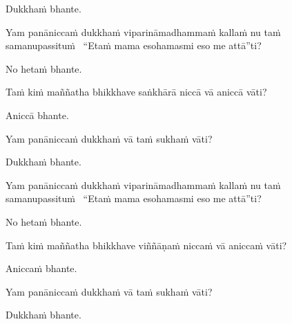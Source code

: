 \begin{pali-hangtogether}
  Dukkhaṁ bhante.
\end{pali-hangtogether}

\begin{pali-hangtogether}
  Yam panāniccaṁ dukkhaṁ viparināmadhammaṁ kallaṁ nu taṁ samanupassituṁ \breathmark\ ``Etaṁ mama esohamasmi eso me attā''ti?
\end{pali-hangtogether}

\begin{pali-hangtogether}
  No hetaṁ bhante.
\end{pali-hangtogether}

\begin{pali-hang}
  Taṁ kiṁ maññatha bhikkhave saṅkhārā niccā vā aniccā vāti?
\end{pali-hang}

\begin{pali-hangtogether}
  Aniccā bhante.
\end{pali-hangtogether}

\begin{pali-hangtogether}
  Yam panāniccaṁ dukkhaṁ vā taṁ sukhaṁ vāti?
\end{pali-hangtogether}

\begin{pali-hangtogether}
  Dukkhaṁ bhante.
\end{pali-hangtogether}

\begin{pali-hangtogether}
  Yam panāniccaṁ dukkhaṁ viparināmadhammaṁ kallaṁ nu taṁ samanupassituṁ \breathmark\ ``Etaṁ mama esohamasmi eso me attā''ti?
\end{pali-hangtogether}

\begin{pali-hangtogether}
  No hetaṁ bhante.
\end{pali-hangtogether}

\begin{pali-hang}
  Taṁ kiṁ maññatha bhikkhave viññāṇaṁ niccaṁ vā aniccaṁ vāti?
\end{pali-hang}

\begin{pali-hangtogether}
  Aniccaṁ bhante.
\end{pali-hangtogether}

\begin{pali-hangtogether}
  Yam panāniccaṁ dukkhaṁ vā taṁ sukhaṁ vāti?
\end{pali-hangtogether}

\begin{pali-hangtogether}
  Dukkhaṁ bhante.
\end{pali-hangtogether}

